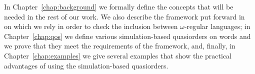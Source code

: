 In Chapter~\ref{chap:background} we formally define the concepts that will be
needed in the rest of our work.
We also describe the framework put forward in~\cite{ganty2020omegalang} on
which we rely in order to check the inclusion between $\omega$-regular languages;
in Chapter~\ref{chap:qos} we define various simulation-based quasiorders on words
and we prove that they meet the requirements of the framework, and, finally,
in Chapter~\ref{chap:examples} we give several examples that show the practical
advantages of using the simulation-based quasiorders.
